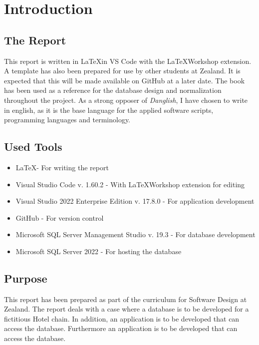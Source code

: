 \chapter{Introduction}
\label{chapter:introduction}

\section{The Report}
This report is written in \LaTeX  in VS Code with the \LaTeX  Workshop extension.
A template has also been prepared for use by other students at Zealand. It is expected that this will be made available on GitHub at a later date.
The book \cite[Database Systems: A Practical Approach to Design, Implementation, and Management]{connolly2023database} has been used as a reference for the database design and normalization throughout the project.
As a strong opposer of \emph{Danglish}, I have chosen to write in english, as it is the base language for the applied software scripts, programming languages and terminology.

\section{Used Tools}
\begin{itemize}
    \item \LaTeX  - For writing the report
    \item Visual Studio Code v. 1.60.2 - With \LaTeX  Workshop extension for editing
    \item Visual Studio 2022 Enterprise Edition v. 17.8.0 - For application development
    \item GitHub - For version control
    \item Microsoft SQL Server Management Studio v. 19.3 - For database development
    \item Microsoft SQL Server 2022 - For hosting the database
\end{itemize}

\section{Purpose}
This report has been prepared as part of the curriculum for Software Design at Zealand. The report deals with a case where a database is to be developed for a fictitious Hotel chain. In addition, an application is to be developed that can access the database.
Furthermore an application is to be developed that can access the database.

